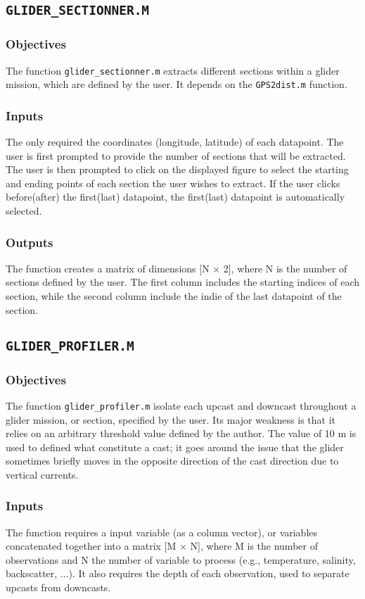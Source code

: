 \documentclass[11pt,A4]{report}
\begin{document}
\subsection{\texttt{GLIDER\_SECTIONNER.M}}
\subsubsection{Objectives}
The function \texttt{glider\_sectionner.m} extracts different sections within a glider mission, which are defined by the user. It depends on the \texttt{GPS2dist.m} function.

\subsubsection{Inputs}
The only required the coordinates (longitude, latitude) of each datapoint. The user is first prompted to provide the number of sections that will be extracted. The user is then prompted to click on the displayed figure to select the starting and ending points of each section the user wishes to extract. If the user clicks before(after) the first(last) datapoint, the first(last) datapoint is automatically selected.

\subsubsection{Outputs}
The function creates a matrix of dimensions [N $\times$ 2], where N is the number of sections defined by the user. The first column includes the starting indices of each section, while the second column include the indie of the last datapoint of the section. 

\subsection{\texttt{GLIDER\_PROFILER.M}}
\subsubsection{Objectives}
The function \texttt{glider\_profiler.m} isolate each upcast and downcast throughout a glider mission, or section, specified by the user. Its major weakness is that it relies on an arbitrary threshold value defined by the author. The value of 10 m is used to defined what constitute a cast; it goes around the issue that the glider sometimes briefly moves in the opposite direction of the cast direction due to vertical currents.

\subsubsection{Inputs}
The function requires a input variable (as a column vector), or variables concatenated together into a matrix [M $\times$ N], where M is the number of observations and N the number of variable to process (e.g., temperature, salinity, backscatter, ...). It also requires the depth of each observation, used to separate upcasts from downcasts. 
\end{document}
